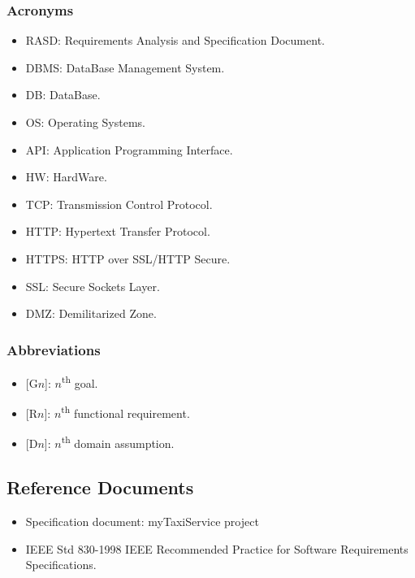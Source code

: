 \documentclass[a4paper,11pt]{report} %
\begin{document}
	\subsubsection{Acronyms}
	\begin{itemize}
		\item RASD: Requirements Analysis and Specification Document.
		\item DBMS: DataBase Management System.
		\item DB: DataBase.
		\item OS: Operating Systems.
		\item API: Application Programming Interface.
		\item HW: HardWare.
		\item TCP: Transmission Control Protocol.
		\item HTTP: Hypertext Transfer Protocol.
		\item HTTPS: HTTP over SSL/HTTP Secure.
		\item SSL: Secure Sockets Layer.
		\item DMZ: Demilitarized Zone.
		
	\end{itemize}
	
		\subsubsection{Abbreviations}
		\begin{itemize}
			\item {[}G$n${]}: $n$\textsuperscript{th} goal.
			\item {[}R$n${]}: $n$\textsuperscript{th} functional requirement.
			\item {[}D$n${]}: $n$\textsuperscript{th} domain assumption.
		\end{itemize}
	
	\subsection{Reference Documents}
		\begin{itemize}
			\item Specification document: myTaxiService project
			\item IEEE Std 830-1998 IEEE Recommended Practice for Software Requirements	Specifications.
		\end{itemize}
	
\end{document}
